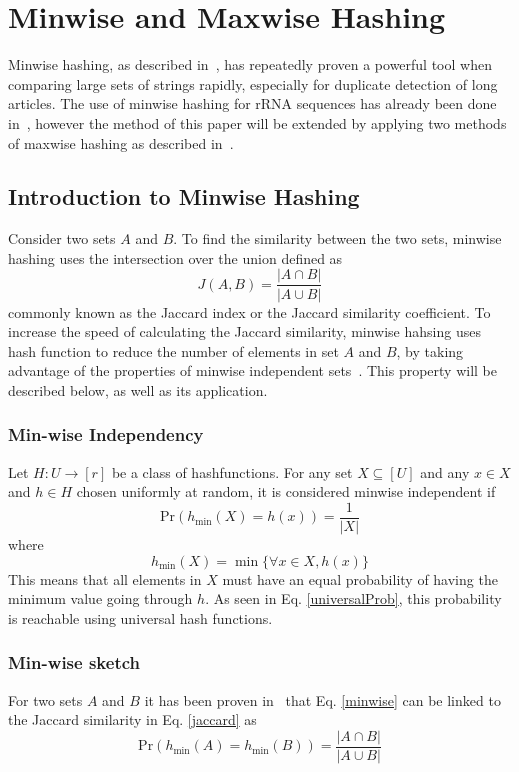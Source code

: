 \documentclass[../../main.tex]{subfiles}
\begin{document}
\section{Minwise and Maxwise Hashing}
Minwise hashing, as described in~\cite{MinwiseIndependent}, has repeatedly proven a powerful tool when comparing large sets of strings rapidly, especially for duplicate detection of long articles. The use of minwise hashing for rRNA sequences has already been done in~\cite{MinhashMapreduce}, however the method of this paper will be extended by applying two methods of maxwise hashing as described in~\cite{minmaxhash}.
\subsection{Introduction to Minwise Hashing}

Consider two sets $A$ and $B$. To find the similarity between the two sets, minwise hashing uses the intersection over the union defined as
\begin{equation}\label{jaccard}
J(A,B)=\frac{|A\cap B|}{|A\cup B|}
\end{equation}
commonly known as the Jaccard index or the Jaccard similarity coefficient. To increase the speed of calculating the Jaccard similarity, minwise hahsing uses hash function to reduce the number of elements in set $A$ and $B$, by taking advantage of the properties of minwise independent sets~\cite[pp. 3]{MinwiseIndependent}. This property will be described below, as well as its application.
\subsubsection{Min-wise Independency}
Let $H: U \rightarrow [r]$ be a class of hashfunctions. For any set $X\subseteq [U]$ and any $x \in X$ and $h\in H$ chosen uniformly at random, it is considered minwise independent if
\begin{equation}\label{minwise}
\mathrm{Pr}(h_{\min}(X)=h(x))=\frac{1}{|X|}
\end{equation}
where
$$
h_{\min}(X) = \min\{\forall x \in X, h(x)\} 
$$
This means that all elements in $X$ must have an equal probability of having the minimum value going through $h$. As seen in Eq. \ref{universalProb}, this probability is reachable using universal hash functions.

\subsubsection{Min-wise sketch}
For two sets $A$ and $B$ it has been proven in~\cite{protominwise} that Eq. \ref{minwise} can be linked to the Jaccard similarity in Eq. \ref{jaccard} as
\begin{equation}\label{minwisejaccard}
\mathrm{Pr}(h_{\min}(A)=h_{\min}(B))=\frac{|A\cap B|}{|A\cup B|}
\end{equation}
\end{document}
